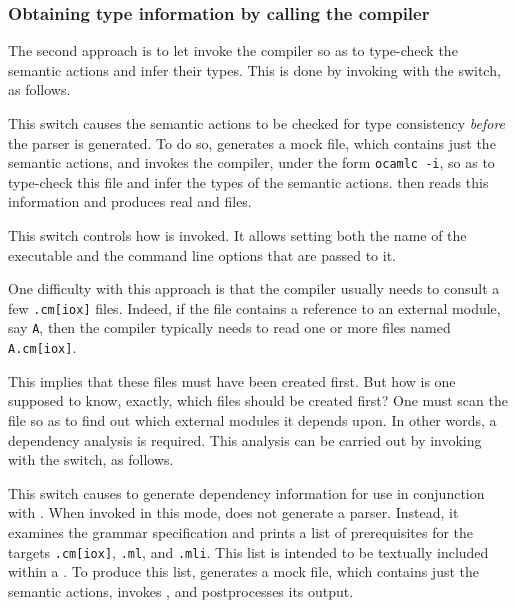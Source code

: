 \documentclass[onecolumn,11pt,nocopyrightspace,preprint]{sigplanconf}
\begin{document}
\subsubsection{Obtaining \ocaml type information by calling the \ocaml compiler}
\label{sec:build:infer:direct}

The second approach is to let \menhir invoke the \ocaml compiler so as to
type-check the semantic actions and infer their types. This is done by
invoking \menhir with the \oinfer switch, as follows.

\docswitch{\oinfer} This switch causes the semantic actions to be checked for
type consistency \emph{before} the parser is generated. To do so, \menhir
generates a mock \ml file, which contains just the semantic actions, and
invokes the \ocaml compiler, under the form \verb+ocamlc -i+, so as to
type-check this file and infer the types of the semantic actions. \menhir then
reads this information and produces real \ml and \mli files.


 This switch controls how \ocamlc is invoked.
It allows setting both the name of the executable and the command line options
that are passed to it.

\docskip

One difficulty with this approach is that the \ocaml compiler usually
needs to consult a few \texttt{.cm[iox]} files. Indeed, if the \mly file
contains a reference to an external \ocaml module, say \texttt{A}, then the
\ocaml compiler typically needs to read one or more files named
\texttt{A.cm[iox]}.

This implies that these files must have been created first. But how is one
supposed to know, exactly, which files should be created first? One must scan
the \mly file so as to find out which external modules it depends upon. In
other words, a dependency analysis is required. This analysis can be carried
out by invoking \menhir with the \odepend switch, as follows.

\docswitch{\odepend} This switch causes \menhir to generate dependency
information for use in conjunction with \make. When invoked in this mode,
\menhir does not generate a parser. Instead, it examines the grammar
specification and prints a list of prerequisites for the targets
\texttt{.cm[iox]}, \texttt{.ml}, and
\texttt{.mli}. This list is intended to be textually included
within a \Makefile.
%
%
To produce this list, \menhir generates a mock \ml file, which contains just
the semantic actions, invokes \ocamldep, and postprocesses its output.
\end{document}
